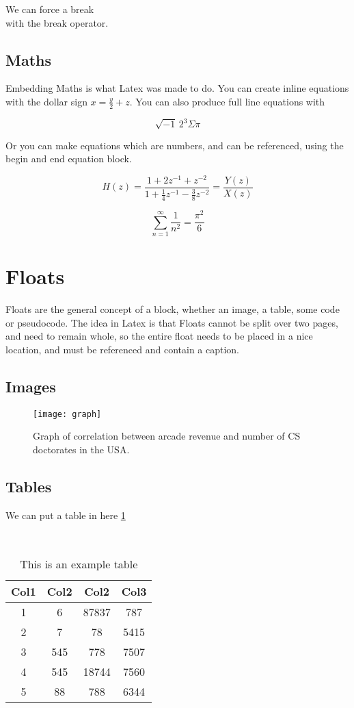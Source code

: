 	We can force a break \\ with the break operator.
	
	\subsection{Maths}
	Embedding Maths is what Latex was made to do. You can create inline equations with the dollar sign $x = \frac{y}{2} + z$. You can also produce full line equations with 
	
	$$\sqrt{-1} \, 2^3 \Sigma \pi $$
	
	Or you can make equations which are numbers, and can be referenced, using the begin and end equation block.
	
	\begin{equation}
		\label{Eq:filter}
		H(z) = \frac{1+2z^{-1}+z^{-2}}{1+\frac{1}{4}z^{-1}-\frac{3}{8}z^{-2}} = \frac{Y(z)}{X(z)}
	\end{equation}   
	
	\begin{equation}
		\label{Eq:infSum}
		\sum^\infty_{n=1} \frac{1}{n^2} = \frac{\pi^2}{6}
	\end{equation} 
	
	
	\section{Floats}
	Floats are the general concept of a block, whether an image, a table, some code or pseudocode. The idea in Latex is that Floats cannot be split over two pages, and need to remain whole, so the entire float needs to be placed in a nice location, and must be referenced and contain a caption.
	
	
	\subsection{Images}
	\begin{figure}[h]
		\centering
		\texttt{[image: graph]}
		\caption{Graph of correlation between arcade revenue and number of CS doctorates in the USA.}
		\label{fig:graph}
	\end{figure}
	
	\subsection{Tables}
	We can put a table in here \ref{tbl:example}
	

	\begin{table}[h]
		\centering
		\ \begin{tabular}{||c c c c||} 
		\hline
		Col1 & Col2 & Col2 & Col3 \\ [0.5ex] 
		\hline\hline
		1 & 6 & 87837 & 787 \\ 
		\hline
		2 & 7 & 78 & 5415 \\
		\hline
		3 & 545 & 778 & 7507 \\
		\hline
		4 & 545 & 18744 & 7560 \\
		\hline
		5 & 88 & 788 & 6344 \\ [1ex] 
		\hline
	\end{tabular}
	\caption{This is an example table}
	\label{tbl:example}
	\end{table}

